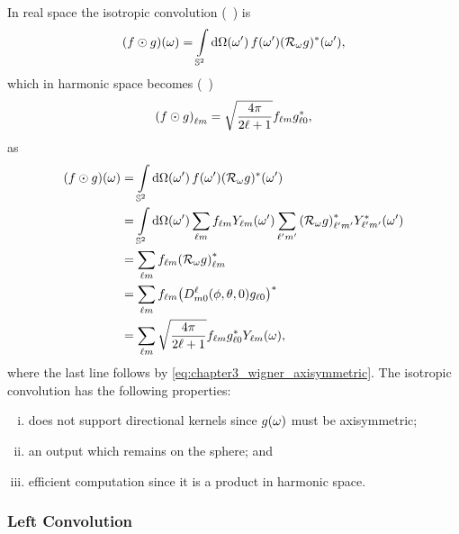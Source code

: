 In real space the isotropic convolution (\eg{}~\cite{McEwen2007,Wei2011,Kennedy2011}) is
%
\begin{equation}
	\pixel{(f \odot g)}
	= \integrateSphere{\omega'} \pixel[']{f} \pixel[']{\conj{(\rotation{\omega}g)}},
\end{equation}
%
which in harmonic space becomes (\eg{}~\cite{McEwen2007})
%
\begin{equation}\label{eq:chapter3_isotropic_harmonic}
	\harmonic{(f \odot g)}
	= \sqrt{\inverseFactor} \harmonic{f} \conj{\axiHarmonic{g}},
\end{equation}
%
as
%
\begin{align}
	\pixel{(f \odot g)}
	 & = \integrateSphere{\omega'} \pixel[']{f} \pixel[']{\conj{(\rotation{\omega}g)}} \nonumber{}                                                                                           \\
	 & = \integrateSphere{\omega'} \harmonicSum \harmonic{f} \pixel[']{\harmonic{Y}} \harmonicSum['] \conj{\harmonic[']{(\rotation{\omega}g)}} \pixel[']{\conj{\harmonic[']{Y}}} \nonumber{} \\
	 & = \harmonicSum \harmonic{f} \conj{\harmonic{(\rotation{\omega}g)}} \nonumber                                                                                                          \\
	 & = \harmonicSum \harmonic{f} \conj{\big(\wigner{\ell}{m}{0}(\phi,\theta,0) \axiHarmonic{g}\big)} \nonumber{}                                                                           \\
	 & = \harmonicSum \sqrt{\inverseFactor} \harmonic{f} \conj{\axiHarmonic{g}} \pixel{\harmonic{Y}},
\end{align}
%
where the last line follows by \cref{eq:chapter3_wigner_axisymmetric}.
The isotropic convolution has the following properties:
%
\begin{enumerate}[(i),nosep,left=\parindent]
	\item does not support directional kernels since \(\pixel{g}\) must be axisymmetric;
	\item an output which remains on the sphere; and
	\item efficient computation since it is a product in harmonic space.
\end{enumerate}

\subsubsection{Left Convolution}


